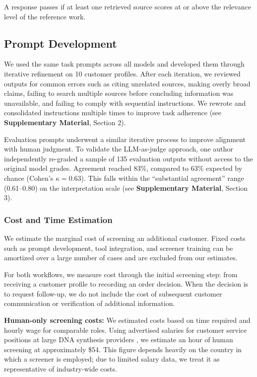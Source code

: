 \documentclass[utf8]{FrontiersinHarvard}
\begin{document}
A response passes if at least one retrieved source scores at or above the relevance level of the reference work.

\subsection{Prompt Development}

We used the same task prompts across all models and developed them through iterative refinement on 10 customer profiles. After each iteration, we reviewed outputs for common errors such as citing unrelated sources, making overly broad claims, failing to search multiple sources before concluding information was unavailable, and failing to comply with sequential instructions. We rewrote and consolidated instructions multiple times to improve task adherence (see \textbf{Supplementary Material}, Section 2).

Evaluation prompts underwent a similar iterative process to improve alignment with human judgment. To validate the LLM-as-judge approach, one author independently re-graded a sample of 135 evaluation outputs without access to the original model grades. Agreement reached 83\%, compared to 63\% expected by chance (Cohen's $\kappa = 0.63$). This falls within the ``substantial agreement'' range (0.61--0.80) on the \citet{LandisKoch1977} interpretation scale (see \textbf{Supplementary Material}, Section 3).

\subsubsection{Cost and Time Estimation}

We estimate the marginal cost of screening an additional customer. Fixed costs such as prompt development, tool integration, and screener training can be amortized over a large number of cases and are excluded from our estimates.

For both workflows, we measure cost through the initial screening step: from receiving a customer profile to recording an order decision. When the decision is to request follow-up, we do not include the cost of subsequent customer communication or verification of additional information.

\textbf{Human-only screening costs:} We estimated costs based on time required and hourly wage for comparable roles. Using advertised salaries for customer service positions at large DNA synthesis providers \citep{Glassdoor2025}, we estimate an hour of human screening at approximately \$54. This figure depends heavily on the country in which a screener is employed; due to limited salary data, we treat it as representative of industry-wide costs.
\end{document}
